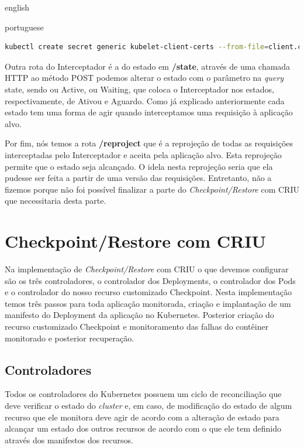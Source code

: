 \begin{otherlanguage*}{english}
\begin{otherlanguage*}{portuguese}
\begin{lstlisting}[language=bash,caption={Criação do Secret para comunicação com o kubelet para compartilhamento com nosso Interceptador.},label={listing:kubelet-secret}]
kubectl create secret generic kubelet-client-certs --from-file=client.crt=/etc/kubernetes/pki/apiserver-kubelet-client.crt --from-file=client.key=/etc/kubernetes/pki/apiserver-kubelet-client.key
\end{lstlisting}

Outra rota do Interceptador é a do estado em \textbf{/state}, através de uma chamada
HTTP ao método POST podemos alterar o estado com o parâmetro na \textit{query} state,
sendo ou Active, ou Waiting, que coloca o Interceptador nos estados, respectivamente,
de Ativou e Aguardo. Como já explicado anteriormente cada estado tem uma forma de agir
quando interceptamos uma requisição à aplicação alvo.

Por fim, nós temos a rota \textbf{/reproject} que é a reprojeção de todas as requisições
interceptadas pelo Interceptador e aceita pela aplicação alvo. Esta reprojeção permite
que o estado seja alcançado. O idela nesta reprojeção seria que ela pudesse ser feita a
partir de uma versão das requisições. Entretanto, não a fizemos porque não foi possível
finalizar a parte do \textit{Checkpoint/Restore} com CRIU que necessitaria desta parte.

\section{Checkpoint/Restore com CRIU}

Na implementação de \textit{Checkpoint/Restore} com CRIU o que devemos configurar são
os três controladores, o controlador dos Deployments, o controlador dos Pods e o
controlador do nosso recurso customizado Checkpoint. Nesta implementação temos três
passos para toda aplicação monitorada, criação e implantação de um manifesto do
Deployment da aplicação no Kubernetes. Posterior criação do recurso customizado
Checkpoint e monitoramento das falhas do contêiner monitorado e posterior recuperação.

\subsection{Controladores}

Todos os controladores do Kubernetes possuem um ciclo de reconciliação que deve
verificar o estado do \textit{cluster} e, em caso, de modificação do estado de algum
recurso que ele monitora deve agir de acordo com a alteração de estado para alcançar
um estado dos outros recursos de acordo com o que ele tem definido através dos manifestos
dos recursos.


\end{otherlanguage*}
\end{otherlanguage*}
